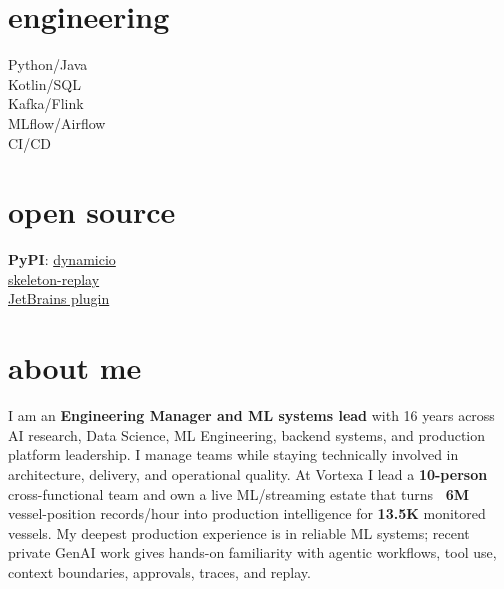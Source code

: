 \documentclass[]{../../../../friggeri-cv}
\begin{document}
\begin{aside}
    \section{engineering}
        {\footnotesize Python/Java\\Kotlin/SQL\\Kafka/Flink\\MLflow/Airflow\\CI/CD}
    \section{open source}
        {\footnotesize \textbf{PyPI}: \href{https://pypi.org/project/dynamicio/}{dynamicio}\\\href{https://pypi.org/project/skeleton-replay/}{skeleton-replay}\\\href{https://plugins.jetbrains.com/plugin/32807-skeleton-replay}{JetBrains plugin}}
\end{aside}

\section{about me}
{\normalsize I am an \textbf{Engineering Manager and ML systems lead} with 16 years across AI research, Data Science, ML Engineering, backend systems, and production platform leadership. I manage teams while staying technically involved in architecture, delivery, and operational quality. At Vortexa I lead a \textbf{10-person} cross-functional team and own a live ML/streaming estate that turns \textbf{~6M} vessel-position records/hour into production intelligence for \textbf{13.5K} monitored vessels. My deepest production experience is in reliable ML systems; recent private GenAI work gives hands-on familiarity with agentic workflows, tool use, context boundaries, approvals, traces, and replay.}
\end{document}
